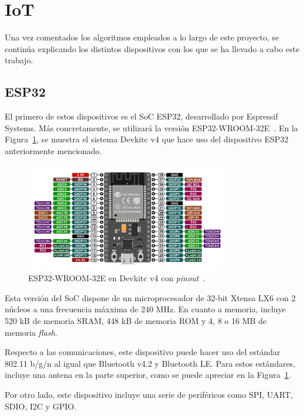 \section{IoT}\label{sec:iot}

Una vez comentados los algoritmos empleados a lo largo de este proyecto, se continúa explicando los distintos dispositivos con los que se ha llevado a cabo este trabajo.

\subsection{ESP32}\label{subsec:esp32}

El primero de estos dispositivos es el \ac{SoC} ESP32, desarrollado por Espressif Systems.
Más concretamente, se utilizará la versión ESP32-WROOM-32E~\cite{esp32-spec}.
En la Figura~\ref{fig:esp32-pinout}, se muestra el sistema Devkitc v4 que hace uso del dispositivo ESP32 anteriormente mencionado.

\begin{figure}[h]
    \centering
    \includegraphics[width=0.8\textwidth]{figures/esp32-pinout.jpg}
    \caption{ESP32-WROOM-32E en Devkitc v4 con \textit{pinout}~\cite{esp32-pinout}.}
    \label{fig:esp32-pinout}
\end{figure}

Esta versión del \ac{SoC} dispone de un microprocesador de 32-bit Xtensa LX6 con 2 núcleos a una frecuencia máxxima de 240 MHz.
En cuanto a memoria, incluye 520 kB de memoria SRAM, 448 kB de memoria ROM y 4, 8 o 16 MB de memoria \textit{flash}.

Respecto a las comunicaciones, este dispositivo puede hacer uso del estándar 802.11 b/g/n al igual que Bluetooth v4.2 y Bluetooth LE.
Para estos estándares, incluye una antena en la parte superior, como se puede apreciar en la Figura~\ref{fig:esp32-pinout}.

Por otro lado, este dispositivo incluye una serie de periféricos como \ac{SPI}, \ac{UART}, \ac{SDIO}, \ac{I2C} y \ac{GPIO}.



